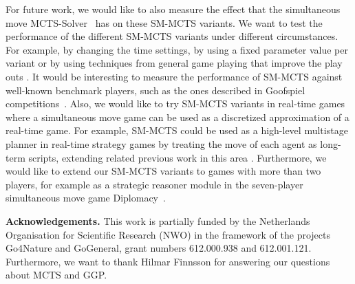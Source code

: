 \documentclass[conference]{IEEEtran}
\begin{document}
For future work, we would like to also measure the effect that the simultaneous move MCTS-Solver~\cite[Chapter 6]{Finnsson12} has on these 
SM-MCTS variants. 
We want to test the performance of the different SM-MCTS variants under different circumstances. For example, by changing the time settings, 
by using a fixed parameter value per variant or by using techniques from general game playing that improve the play outs \cite{Bjornsson09CadiaPlayer}.
It would be interesting to measure the performance of SM-MCTS against well-known benchmark players, such as the ones described 
in Goofspiel competitions~\cite{Dror13Repeated}.
Also, we would like to try SM-MCTS variants in real-time games where a simultaneous move game can be used as a discretized approximation 
of a real-time game. For example, SM-MCTS could be used as a high-level multistage planner in real-time strategy games by treating the move of each agent
as long-term scripts, extending related previous work in this area \cite{Sailor07adversarial}. 
Furthermore, we would like to extend our SM-MCTS variants to games with more than two players, for example as a strategic reasoner 
module in the seven-player simultaneous move game Diplomacy~\cite{Fabregues11DipGame}.

{\bf Acknowledgements.} {\small This work is partially funded by the Netherlands Organisation for
Scientific Research (NWO) in the framework of the projects Go4Nature and GoGeneral, grant numbers 
612.000.938 and 612.001.121. Furthermore, we want to thank Hilmar Finnsson for answering our questions about MCTS and GGP.}

%
%
\end{document}
